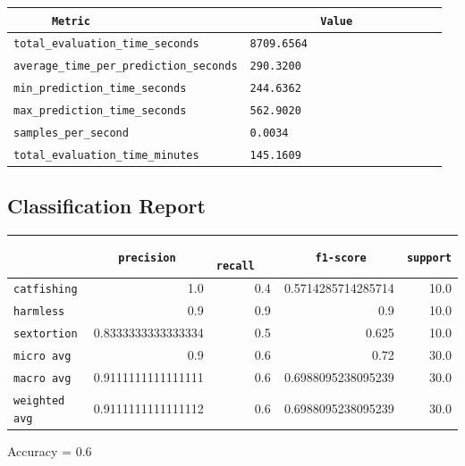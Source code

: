 \documentclass{article}
\begin{document}
\begin{center}
\begin{tabular}{l | l} \hline
    \verb|      Metric     | & \verb|           Value           | \\ \hline
    \hline
    \verb|total_evaluation_time_seconds| & \verb|8709.6564                    | \\ \hline
    \verb|average_time_per_prediction_seconds| & \verb|290.3200                     | \\ \hline
    \verb|min_prediction_time_seconds| & \verb|244.6362                     | \\ \hline
    \verb|max_prediction_time_seconds| & \verb|562.9020                     | \\ \hline
    \verb|samples_per_second| & \verb|0.0034                       | \\ \hline
    \verb|total_evaluation_time_minutes| & \verb|145.1609                     | \\ \hline
\end{tabular}
\end{center}

\subsection{Classification Report}

\begin{center}
\begin{tabular}{l | r | r | r | r} \hline
    \verb|            | & \verb|    precision     | & \verb|      recall      | & \verb|     f1-score     | & \verb|support| \\ \hline
    \hline
    \verb|catfishing | & 1.0 & 0.4 & 0.5714285714285714 &    10.0 \\ \hline
    \verb|harmless   | & 0.9 & 0.9 & 0.9 &    10.0 \\ \hline
    \verb|sextortion | & 0.8333333333333334 & 0.5 & 0.625 &    10.0 \\ \hline
    \verb|micro avg  | & 0.9 & 0.6 & 0.72 &    30.0 \\ \hline
    \verb|macro avg  | & 0.9111111111111111 & 0.6 & 0.6988095238095239 &    30.0 \\ \hline
    \verb|weighted avg| & 0.9111111111111112 & 0.6 & 0.6988095238095239 &    30.0 \\ \hline
\end{tabular}
\end{center}

\begin{center}
Accuracy = 0.6
\end{center}
\end{document}
